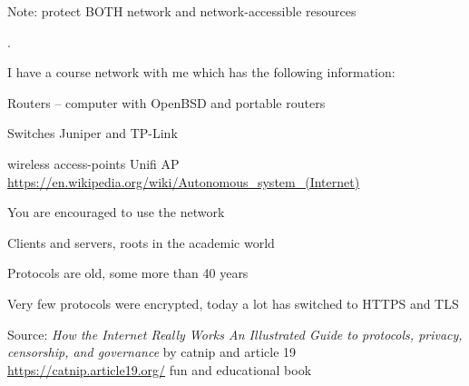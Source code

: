 \documentclass[Screen16to9,17pt]{foils}
\begin{document}
Note: protect BOTH network and network-accessible resources

.

\begin{list1}
\item I have a course network with me which has the following information:
\begin{list2}
\item Routers -- computer with OpenBSD and portable routers
\item Switches Juniper and TP-Link
\item wireless access-points Unifi AP
\url{https://en.wikipedia.org/wiki/Autonomous_system_(Internet)}

\end{list2}
\end{list1}

\centerline{\Large You are encouraged to use the network}




\begin{list1}
\item Clients and servers, roots in the academic world
\item Protocols are old, some more than 40 years
\item Very few protocols were encrypted, today a lot has switched to HTTPS and TLS
\end{list1}



{\small Source: \emph{How the Internet Really Works
An Illustrated Guide to protocols, privacy, censorship, and governance} by catnip and article 19}\\
\url{https://catnip.article19.org/} {\color{red}\faHeart}
fun and educational book




\end{document}
